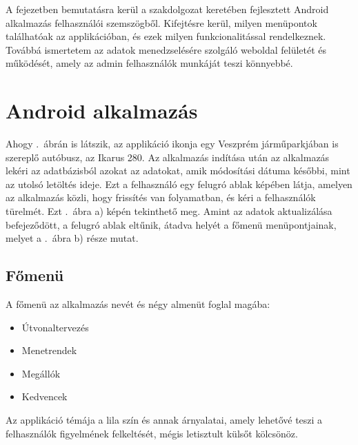 
A fejezetben bemutatásra kerül a szakdolgozat keretében fejlesztett Android alkalmazás felhasználói szemszögből.
Kifejtésre kerül, milyen menüpontok találhatóak az applikációban, és ezek milyen funkcionalitással rendelkeznek.
Továbbá ismertetem az adatok menedzselésére szolgáló weboldal felületét és működését, amely az admin felhasználók munkáját teszi könnyebbé.

\section{Android alkalmazás}
\label{androidapp}
Ahogy .\ ábrán is látszik, az applikáció ikonja egy Veszprém járműparkjában is szereplő autóbusz, az Ikarus 280.
Az alkalmazás indítása után az alkalmazás lekéri az adatbázisból azokat az adatokat, amik módosítási dátuma későbbi, mint az utolsó letöltés ideje.
Ezt a felhasználó egy felugró ablak képében látja, amelyen az alkalmazás közli, hogy frissítés van folyamatban, és kéri a felhasználók türelmét.
Ezt .\ ábra a) képén tekinthető meg.
Amint az adatok aktualizálása befejeződött, a felugró ablak eltűnik, átadva helyét a főmenü menüpontjainak, melyet a .\ ábra b) része mutat.
\subsection{Főmenü}
\label{fomenu}
A főmenü az alkalmazás nevét és négy almenüt foglal magába:
\begin{itemize}
	\item Útvonaltervezés
	\item Menetrendek
	\item Megállók
	\item Kedvencek
\end{itemize}

Az applikáció témája a lila szín és annak árnyalatai, amely lehetővé teszi a felhasználók figyelmének felkeltését, mégis letisztult külsőt kölcsönöz.

